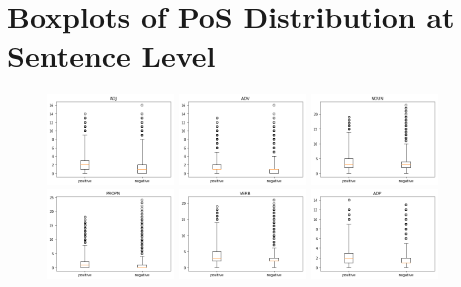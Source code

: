 \documentclass[12pt]{diazessay} %
\begin{document}
\section{Boxplots of PoS Distribution at Sentence Level} %
\label{sec:appendix_b}
    \begin{figure}[h!]
    \includegraphics[width=0.3\textwidth]{graphs/box_pos/1.png}
    \includegraphics[width=0.3\textwidth]{graphs/box_pos/2.png}
    \includegraphics[width=0.3\textwidth]{graphs/box_pos/3.png}
    \includegraphics[width=0.3\textwidth]{graphs/box_pos/4.png}
    \includegraphics[width=0.3\textwidth]{graphs/box_pos/5.png}
    \includegraphics[width=0.3\textwidth]{graphs/box_pos/6.png}

\end{figure}
\end{document}
